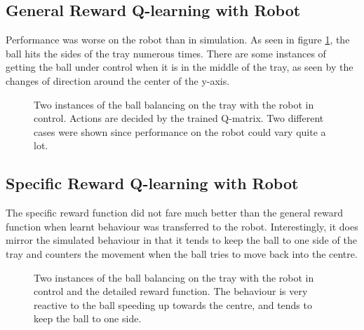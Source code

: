 \documentclass[12pt,a4paper]{article}
\begin{document}
\subsection{General Reward Q-learning with Robot}
Performance was worse on the robot than in simulation. As seen in figure \ref{q_nao}, the ball hits the sides of the tray numerous times. There are some instances of getting the ball under control when it is in the middle of the tray, as seen by the changes of direction around the center of the y-axis.
\begin{figure}[H]
	\centering
	\caption{Two instances of the ball balancing on the tray with the robot in control. Actions are decided by the trained Q-matrix. Two different cases were shown since performance on the robot could vary quite a lot.}
	\label{q_nao}
\end{figure}

\subsection{Specific Reward Q-learning with Robot}
The specific reward function did not fare much better than the general reward function when learnt behaviour was transferred to the robot. Interestingly, it does mirror the simulated behaviour in that it tends to keep the ball to one side of the tray and counters the movement when the ball tries to move back into the centre.
\begin{figure}[H]
	\centering
	\caption{Two instances of the ball balancing on the tray with the robot in control and the detailed reward function. The behaviour is very reactive to the ball speeding up towards the centre, and tends to keep the ball to one side.}
	\label{q_nao_specific}
\end{figure}
\end{document}
